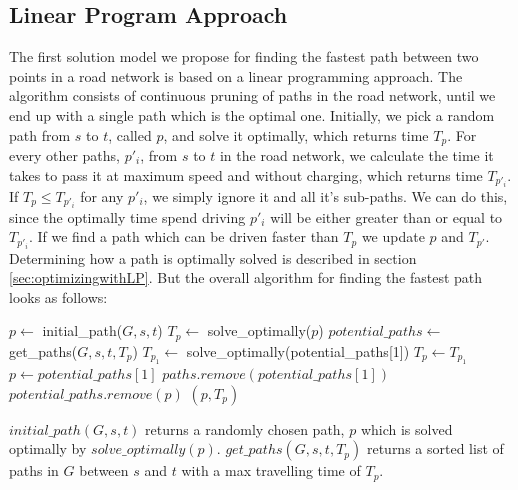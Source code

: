 \subsection{Linear Program Approach}
The first solution model we propose for finding the fastest path between two points in a road network is based on a linear programming approach. 
The algorithm consists of continuous pruning of paths in the road network, until we end up with a single path which is the optimal one. Initially, we pick a random path from $s$ to $t$, called $p$, and solve it optimally, which returns time $T_p$. For every other paths, $p'_i$, from $s$ to $t$ in the road network, we calculate the time it takes to pass it at maximum speed and without charging, which returns time $T_{p'_{i}}$. If $T_p \leq T_{p'_{i}}$ for any $p'_{i}$, we simply ignore it and all it's sub-paths. We can do this, since the optimally time spend driving $p'_i$ will be either greater than or equal to $T_{p'_{i}}$. If we find a path which can be driven faster than $T_p$ we update $p$ and $T_{p'}$. Determining how a path is optimally solved is described in section \ref{sec:optimizingwithLP}. But the overall algorithm for finding the fastest path looks as follows:

\begin{algorithmic}
    \State $p \gets$ initial\_path($G,s,t$) 
    \State $T_p \gets$ solve\_optimally($p$)
    \State $potential\_paths \gets$ get\_paths($G,s,t,T_p$)
    \Repeat 
    	\State $T_{p_1} \gets$ solve\_optimally(potential\_paths[1])
    		\State $T_p \gets T_{p_1}$
    		\State $p \gets potential\_paths[1]$ 
    	\EndIf  
    	\State $paths.remove(potential\_paths[1])$
    			\State $potential\_paths.remove(p)$
    		\EndIf
    	\EndFor
    \State \Return $(p, T_p)$
\EndFunction
\end{algorithmic}

$initial\_path(G,s,t)$ returns a randomly chosen path, $p$ which is solved optimally by $solve\_optimally(p)$. $get\_paths(G,s,t,T_p)$ returns a sorted list of paths in $G$ between $s$ and $t$ with a max travelling time of $T_p$.

